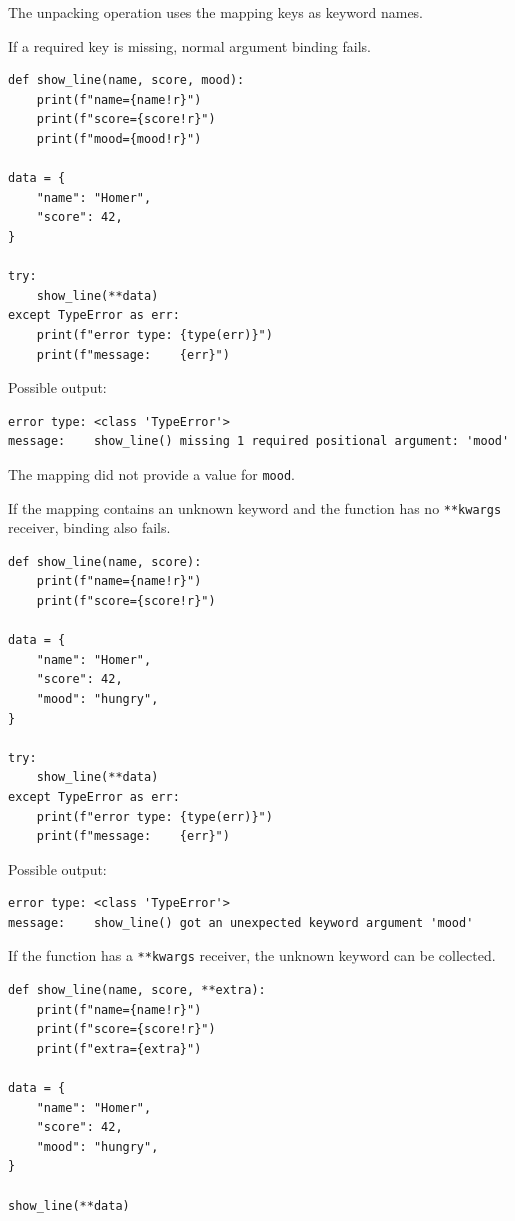 The unpacking operation uses the mapping keys as keyword names.

If a required key is missing, normal argument binding fails.

\begin{verbatim}
def show_line(name, score, mood):
    print(f"name={name!r}")
    print(f"score={score!r}")
    print(f"mood={mood!r}")

data = {
    "name": "Homer",
    "score": 42,
}

try:
    show_line(**data)
except TypeError as err:
    print(f"error type: {type(err)}")
    print(f"message:    {err}")
\end{verbatim}

Possible output:

\begin{verbatim}
error type: <class 'TypeError'>
message:    show_line() missing 1 required positional argument: 'mood'
\end{verbatim}

The mapping did not provide a value for \texttt{mood}.

If the mapping contains an unknown keyword and the function has no \texttt{**kwargs} receiver, binding also fails.

\begin{verbatim}
def show_line(name, score):
    print(f"name={name!r}")
    print(f"score={score!r}")

data = {
    "name": "Homer",
    "score": 42,
    "mood": "hungry",
}

try:
    show_line(**data)
except TypeError as err:
    print(f"error type: {type(err)}")
    print(f"message:    {err}")
\end{verbatim}

Possible output:

\begin{verbatim}
error type: <class 'TypeError'>
message:    show_line() got an unexpected keyword argument 'mood'
\end{verbatim}

If the function has a \texttt{**kwargs} receiver, the unknown keyword can be collected.

\begin{verbatim}
def show_line(name, score, **extra):
    print(f"name={name!r}")
    print(f"score={score!r}")
    print(f"extra={extra}")

data = {
    "name": "Homer",
    "score": 42,
    "mood": "hungry",
}

show_line(**data)
\end{verbatim}

